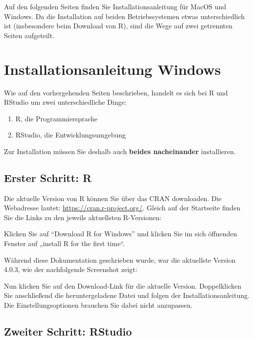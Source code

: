 \documentclass[
]{book}
\begin{document}
Auf den folgenden Seiten finden Sie Installationsanleitung für MacOS und Windows.
Da die Installation auf beiden Betriebssystemen etwas unterschiedlich ist (insbesondere beim Download von R), sind die Wege auf zwei getrennten Seiten aufgeteilt.

\hypertarget{installationsanleitung-windows}{%
\section{Installationsanleitung Windows}\label{installationsanleitung-windows}}

Wie auf den vorhergehenden Seiten beschrieben, handelt es sich bei R und RStudio um zwei unterschiedliche Dinge:

\begin{enumerate}
\def\labelenumi{\arabic{enumi}.}
\item
  R, die Programmiersprache
\item
  RStudio, die Entwicklungsumgebung
\end{enumerate}

Zur Installation müssen Sie deshalb auch \textbf{beides nacheinander} installieren.

\hypertarget{erster-schritt-r}{%
\subsection{Erster Schritt: R}\label{erster-schritt-r}}

Die aktuelle Version von R können Sie über das CRAN downloaden. Die Webadresse lautet: \href{https://cran.r-project.org}{https://cran.r-project.org/}. Gleich auf der Startseite finden Sie die Links zu den jeweils aktuellsten R-Versionen:

Klicken Sie auf ``Download R for Windows'' und klicken Sie im sich öffnenden Fenster auf „install R for the first time``.

Während diese Dokumentation geschrieben wurde, war die aktuellste Version 4.0.3, wie der nachfolgende Screenshot zeigt:

Nun klicken Sie auf den Download-Link für die aktuelle Version. Doppelklicken Sie anschließend die heruntergeladene Datei und folgen der Installationsanleitung. Die Einstellungsoptionen brauchen Sie dabei nicht anzupassen.

\hypertarget{zweiter-schritt-rstudio}{%
\subsection{Zweiter Schritt: RStudio}\label{zweiter-schritt-rstudio}}
\end{document}
